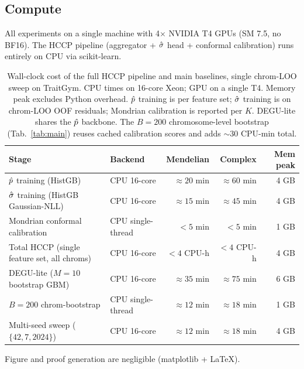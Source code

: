 \subsection{Compute}
\label{app:data:compute}

All experiments on a single machine with 4$\times$ NVIDIA T4 GPUs (SM 7.5, no BF16). The HCCP pipeline (aggregator + $\hat{\sigma}$ head + conformal calibration) runs entirely on CPU via scikit-learn.

\begin{table}[h]
\centering
\small
\caption{Wall-clock cost of the full HCCP pipeline and main baselines, single chrom-LOO sweep on TraitGym. CPU times on 16-core Xeon; GPU on a single T4. Memory peak excludes Python overhead. $\hat{p}$ training is per feature set; $\hat{\sigma}$ training is on chrom-LOO OOF residuals; Mondrian calibration is reported per $K$. DEGU-lite shares the $\hat{p}$ backbone. The $B = 200$ chromosome-level bootstrap (Tab.~\ref{tab:main}) reuses cached calibration scores and adds $\sim 30$ CPU-min total.}
\label{tab:compute}
\setlength{\tabcolsep}{5pt}
\begin{tabular}{llrrr}
\toprule
Stage & Backend & Mendelian & Complex & Mem peak \\
\midrule
$\hat{p}$ training (HistGB)                    & CPU 16-core       & $\approx 20$ min & $\approx 60$ min & 4 GB \\
$\hat{\sigma}$ training (HistGB Gaussian-NLL)        & CPU 16-core       & $\approx 15$ min & $\approx 45$ min & 4 GB \\
Mondrian conformal calibration                & CPU single-thread & $< 5$ min        & $< 5$ min        & 1 GB \\
Total HCCP (single feature set, all chroms)   & CPU 16-core       & $< 4$ CPU-h      & $< 4$ CPU-h      & 4 GB \\
\midrule
DEGU-lite ($M = 10$ bootstrap GBM)            & CPU 16-core       & $\approx 35$ min & $\approx 75$ min & 6 GB \\
\midrule
$B = 200$ chrom-bootstrap                     & CPU single-thread & $\approx 12$ min & $\approx 18$ min & 1 GB \\
Multi-seed sweep ($\{42, 7, 2024\}$)          & CPU 16-core       & $\approx 12$ min & $\approx 18$ min & 4 GB \\
\bottomrule
\end{tabular}
\end{table}

Figure and proof generation are negligible (matplotlib + LaTeX).
